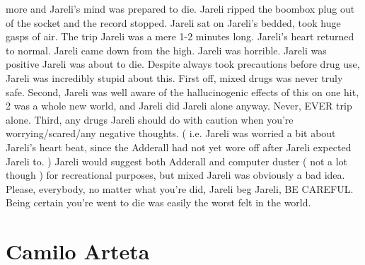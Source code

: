 \documentclass[12pt]{book}
\begin{document}
more and Jareli's mind was prepared to die. Jareli ripped the boombox plug out of the socket and the record stopped. Jareli sat on Jareli's bedded, took huge gasps of air. The trip Jareli was a mere 1-2 minutes long. Jareli's heart returned to normal. Jareli came down from the high. Jareli was horrible. Jareli was positive Jareli was about to die. Despite always took precautions before drug use, Jareli was incredibly stupid about this. First off, mixed drugs was never truly safe. Second, Jareli was well aware of the hallucinogenic effects of this on one hit, 2 was a whole new world, and Jareli did Jareli alone anyway. Never, EVER trip alone. Third, any drugs Jareli should do with caution when you're worrying/scared/any negative thoughts. ( i.e. Jareli was worried a bit about Jareli's heart beat, since the Adderall had not yet wore off after Jareli expected Jareli to. ) Jareli would suggest both Adderall and computer duster ( not a lot though ) for recreational purposes, but mixed Jareli was obviously a bad idea. Please, everybody, no matter what you're did, Jareli beg Jareli, BE CAREFUL. Being certain you're went to die was easily the worst felt in the world.



\chapter{Camilo Arteta}
\end{document}
